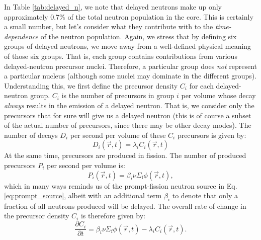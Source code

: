 In Table \ref{tab:delayed_n}, we note that delayed neutrons make up only approximately 0.7\% of the total neutron population in the core. This is certainly a small number, but let's consider what they contribute with to the \emph{time-dependence} of the neutron population. Again, we stress that by defining six groups of delayed neutrons, we move away from a well-defined physical meaning of those six groups. That is, each group contains contributions from various delayed-neutron precursor nuclei. Therefore, a particular group does \emph{not} represent a particular nucleus (although some nuclei may dominate in the different groups). Understanding this, we first define the precursor density $C_i$ for each delayed-neutron group. $C_i$ is the number of precursors in group $i$ per volume whose decay \emph{always} results in the emission of a delayed neutron. That is, we consider only the precursors that for sure will give us a delayed neutron (this is of course a subset of the actual number of precursors, since there may be other decay modes). The number of decays $D_i$ per second per volume of these $C_i$ precursors is given by:
\begin{equation}
	D_i(\vec{r}, t) = \lambda_i C_i(\vec{r}, t)
\end{equation}
At the same time, precursors are produced in fission. The number of produced precursors $P_i$ per second per volume is:
\begin{equation}
	P_i(\vec{r}, t) = \beta_i \nu \Sigma_\text{f} \phi(\vec{r}, t),
\end{equation}
which in many ways reminds us of the prompt-fission neutron source in Eq. \ref{eq:prompt_source}, albeit with an additional term $\beta_i$ to denote that only a fraction of all neutrons produced will be delayed. The overall rate of change in the precursor density $C_i$ is therefore given by:
\begin{equation}
	\frac{\partial C_i}{\partial t} = \beta_i \nu \Sigma_\text{f} \phi(\vec{r}, t) - \lambda_i C_i(\vec{r}, t).
	\label{eq:C_net_change}
\end{equation}

